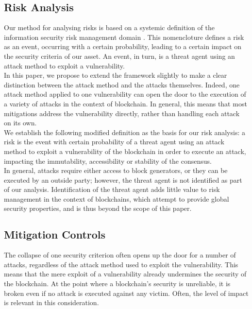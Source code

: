 \documentclass[12pt,a4paper]{article}
\begin{document}
\subsection{Risk Analysis}

Our method for analysing risks is based on a systemic definition of the information security risk management domain \cite{domain}. This nomencloture defines a risk as an event, occurring with a certain probability, leading to a certain impact on the security criteria of our asset. An event, in turn, is a threat agent using an attack method to exploit a vulnerability.\\

In this paper, we propose to extend the framework slightly to make a clear distinction between the attack method and the attacks themselves. Indeed, one attack method applied to one vulnerability can open the door to the execution of a variety of attacks in the context of blockchain. In general, this means that most mitigations address the vulnerability directly, rather than handling each attack on its own.\\

We establish the following modified definition as the basis for our risk analysis: a risk is the event with certain probability of a threat agent using an attack method to exploit a vulnerability of the \gls{blockchain} in order to execute an attack, impacting the immutability, accessibility or stability of the \gls{consensus}.\\

In general, attacks require either access to block generators, or they can be executed by an outside party; however, the threat agent is not identified as part of our analysis. Identification of the threat agent adds little value to risk management in the context of \glspl{blockchain}, which attempt to provide global security properties, and is thus beyond the scope of this paper.\\

\subsection{Mitigation Controls}

The collapse of one security criterion often opens up the door for a number of attacks, regardless of the attack method used to exploit the vulnerability. This means that the mere exploit of a vulnerability already undermines the security of the \gls{blockchain}. At the point where a \gls{blockchain}'s security is unreliable, it is broken even if no attack is executed against any victim. Often, the level of impact is relevant in this consideration.\\
\end{document}
